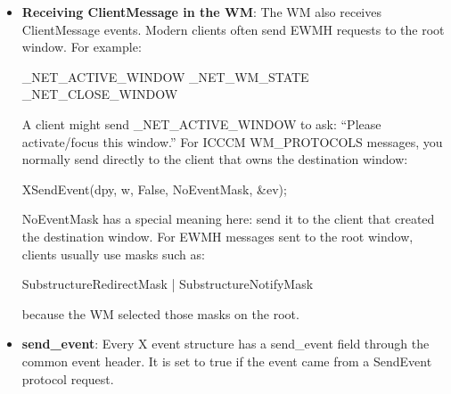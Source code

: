 \documentclass{report}
\begin{document}
\begin{itemize}
\begin{cppcode}
{                if (!XGetWMProtocols(dpy, w, &protocols, &count))
                return False;

                Bool found = False;

                for (int i = 0; i < count; ++i) {
                    if (protocols[i] == protocol) {
                        found = True;
                        break;
                    }
                }

                XFree(protocols);
                return found;
            }
        \end{cppcode}
        \bigbreak \noindent 
        For strict ICCCM behavior, prefer a real event timestamp instead of \textbf{CurrentTime} when you have one.
        \bigbreak \noindent 
        The WM sends the message, and the client decides how to react.
    \item \textbf{Receiving ClientMessage in the WM}: The WM also receives ClientMessage events.
        \bigbreak \noindent 
        Modern clients often send EWMH requests to the root window. For example:
        \bigbreak \noindent 
        \begin{cppcode}
            _NET_ACTIVE_WINDOW
            _NET_WM_STATE
            _NET_CLOSE_WINDOW
        \end{cppcode}
        \bigbreak \noindent 
        A client might send \_NET\_ACTIVE\_WINDOW to ask: “Please activate/focus this window.”
        \bigbreak \noindent 
        For ICCCM WM\_PROTOCOLS messages, you normally send directly to the client that owns the destination window:
        \bigbreak \noindent 
        \begin{cppcode}
            XSendEvent(dpy, w, False, NoEventMask, &ev);
        \end{cppcode}
        \bigbreak \noindent 
        NoEventMask has a special meaning here: send it to the client that created the destination window.
        \bigbreak \noindent 
        For EWMH messages sent to the root window, clients usually use masks such as:
        \bigbreak \noindent 
        \begin{cppcode}
            SubstructureRedirectMask | SubstructureNotifyMask
        \end{cppcode}
        \bigbreak \noindent 
        because the WM selected those masks on the root.
    \item \textbf{send\_event}: Every X event structure has a send\_event field through the common event header. It is set to true if the event came from a SendEvent protocol request.


    \end{itemize}
\end{document}
